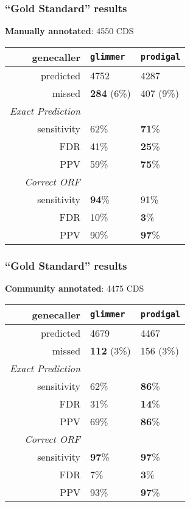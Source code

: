 \begin{frame}
  \frametitle{``Gold Standard'' results}
  \textbf{Manually annotated}: 4550 CDS
  \begin{center}
    \begin{tabular}{r|l|l}
	  genecaller & \texttt{glimmer} & \texttt{prodigal}  \\
	  \hline
	  predicted & 4752    & 4287  \\
	  missed & \textbf{284} (6\%)   & 407 (9\%)  \\
	  \hline
	  \emph{Exact Prediction} & & \\
  	  sensitivity   & 62\%   & \textbf{71}\%  \\
  	  FDR   & 41\%   & \textbf{25}\%  \\  
	  PPV   & 59\% & \textbf{75}\%  \\  
	  \hline
	  \emph{Correct ORF} & & \\
  	  sensitivity   & \textbf{94}\%   & 91\% \\
  	  FDR   & 10\%  & \textbf{3}\% \\  
	  PPV   & 90\% & \textbf{97}\%  \\  
    \end{tabular}
  \end{center}     
\end{frame}

\begin{frame}
  \frametitle{``Gold Standard'' results}
  \textbf{Community annotated}: 4475 CDS
  \begin{center}
	\begin{tabular}{r|l|l}
	  genecaller & \texttt{glimmer} & \texttt{prodigal}  \\
	  \hline
	  predicted & 4679    & 4467  \\
	  missed & \textbf{112} (3\%)   & 156 (3\%)  \\
	  \hline
	  \emph{Exact Prediction} & & \\
  	  sensitivity   & 62\%   & \textbf{86}\%  \\
  	  FDR   & 31\%   & \textbf{14}\%  \\  
	  PPV   & 69\% & \textbf{86}\%  \\  
	  \hline
	  \emph{Correct ORF} & & \\
  	  sensitivity   & \textbf{97}\%   & \textbf{97}\% \\
  	  FDR   & 7\%  & \textbf{3}\% \\  
	  PPV   & 93\% & \textbf{97}\%  \\  
	\end{tabular}
  \end{center}     
\end{frame}

